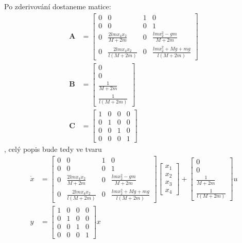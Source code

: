 \documentclass[a4paper, 12pt]{article}
\begin{document}
			Po zderivování dostaneme matice:
			\begin{align*}
				\mathbf{A} &= \left[\begin{matrix}
					0 & 0 & 1 & 0\\
					0 & 0 & 0 & 1\\
					0 & \frac{2lmx_4x_2}{M+2m} & 0 & \frac{lmx_2^2-gm}{M+2m}\\
					0 & \frac{2lmx_4x_2}{l\left(M+2m\right)} & 0 & \frac{lmx_2^2+Mg+mg}{l\left(M+2m\right)}
				\end{matrix}\right]\\
				\mathbf{B} &= \left[\begin{matrix}
					0\\
					0\\
					\frac{1}{M+2m}\\
					\frac{1}{l\left(M+2m\right)}
				\end{matrix}\right]\\
				\mathbf{C} &= \left[\begin{matrix}
					1 & 0 & 0 & 0\\
					0 & 1 & 0 & 0\\
					0 & 0 & 1 & 0\\
					0 & 0 & 0 & 1
				\end{matrix}\right]
			\end{align*}
			, celý popis bude tedy ve tvaru
			\begin{align*}
				\dot{x} &= \left[\begin{matrix}
					0 & 0 & 1 & 0\\
					0 & 0 & 0 & 1\\
					0 & \frac{2lmx_4x_2}{M+2m} & 0 & \frac{lmx_2^2-gm}{M+2m}\\
					0 & \frac{2lmx_4x_2}{l\left(M+2m\right)} & 0 & \frac{lmx_2^2+Mg+mg}{l\left(M+2m\right)}
				\end{matrix}\right]
				\left[\begin{matrix}
					x_1\\
					x_2\\
					x_3\\
					x_4
				\end{matrix}\right]+
				\left[\begin{matrix}
					0\\
					0\\
					\frac{1}{M+2m}\\
					\frac{1}{l\left(M+2m\right)}
				\end{matrix}\right]u\\
				y &= \left[\begin{matrix}
					1 & 0 & 0 & 0\\
					0 & 1 & 0 & 0\\
					0 & 0 & 1 & 0\\
					0 & 0 & 0 & 1
				\end{matrix}\right]x
			\end{align*}
\end{document}
